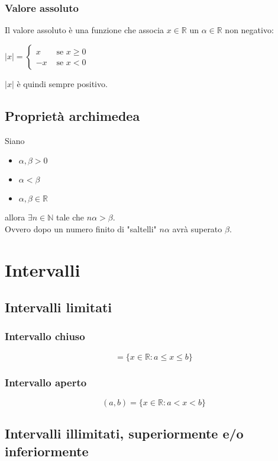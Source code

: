 \documentclass[a4paper,12pt, oneside]{book}
\begin{document}
\subsubsection{Valore assoluto} Il valore assoluto è una funzione che associa
$x\in\mathbb{R}$ un $\alpha\in\mathbb{R}$ non negativo:
\begin{center} $|x|=\left\{
    \begin{array}{ll} x & \mbox{ se } x\geq0 \\ -x & \mbox{ se } x<0
    \end{array} \right.$
\end{center} $|x|$ è quindi sempre positivo.
\subsection{Proprietà archimedea}
\begin{teorema} Siano
  \begin{itemize}
    \item $\alpha,\beta>0$
    \item $\alpha<\beta$
    \item $\alpha,\beta \in \mathbb{R}$
  \end{itemize} allora $\exists n \in \mathbb{N}$ tale che $n\alpha>\beta$.\\
  Ovvero dopo un numero finito di "saltelli" $n\alpha$ avrà superato $\beta$.
\end{teorema}
\newpage
\section{Intervalli}
\subsection{Intervalli limitati}
\subsubsection{Intervallo chiuso}
\begin{equation} [a,b]=\{x\in\mathbb{R}\colon a\leq x\leq b\}
\end{equation}
\subsubsection{Intervallo aperto}
\begin{equation} (a,b)=\{x\in\mathbb{R}\colon a<x<b\}
\end{equation}
\subsection{Intervalli illimitati, superiormente e/o inferiormente}
\end{document}
